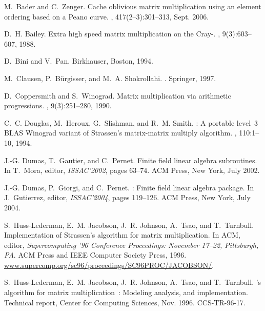 \documentclass{article}
\begin{document}
\begin{thebibliography}{10}

M.~Bader and C.~Zenger.
\newblock Cache oblivious matrix multiplication using an element ordering based
  on a {Peano} curve.
, 417(2--3):301--313, Sept.
  2006.

D.~H. Bailey.
\newblock Extra high speed matrix multiplication on the {C}ray-.
,
  9(3):603--607, 1988.

D.~Bini and V.~Pan.
\newblock Birkhauser, Boston, 1994.

M.~Clausen, P.~{B\"urgisser}, and M.~A. Shokrollahi.
.
\newblock Springer, 1997.

D.~Coppersmith and S.~Winograd.
\newblock Matrix multiplication via arithmetic progressions.
, 9(3):251--280, 1990.

C.~C. Douglas, M.~Heroux, G.~Slishman, and R.~M. Smith.
: A portable level~3 {BLAS} {Winograd} variant of {Strassen}'s
  matrix-matrix multiply algorithm.
, 110:1--10, 1994.

J.-G. Dumas, T.~Gautier, and C.~Pernet.
\newblock Finite field linear algebra subroutines.
\newblock In T.~Mora, editor, {\em {ISSAC}'2002}, pages 63--74. ACM Press, New
  York, July 2002.

J.-G. Dumas, P.~Giorgi, and C.~Pernet.
: Finite field linear algebra package.
\newblock In J.~Gutierrez, editor, {\em {ISSAC}'2004}, pages 119--126. ACM
  Press, New York, July 2004.

S.~Huss-Lederman, E.~M. Jacobson, J.~R. Johnson, A.~Tsao, and T.~Turnbull.
\newblock Implementation of {Strassen}'s algorithm for matrix multiplication.
\newblock In {ACM}, editor, {\em Supercomputing '96 Conference Proceedings:
  November 17--22, Pittsburgh, {PA}}. ACM Press and IEEE Computer Society
  Press, 1996.
\newblock \url{www.supercomp.org/sc96/proceedings/SC96PROC/JACOBSON/}.

S.~Huss-Lederman, E.~M. Jacobson, J.~R. Johnson, A.~Tsao, and T.~Turnbull.
's algorithm for matrix multiplication~: Modeling analysis,
  and implementation.
\newblock Technical report, Center for Computing Sciences, Nov. 1996.
\newblock CCS-TR-96-17.


\end{thebibliography}
\end{document}
